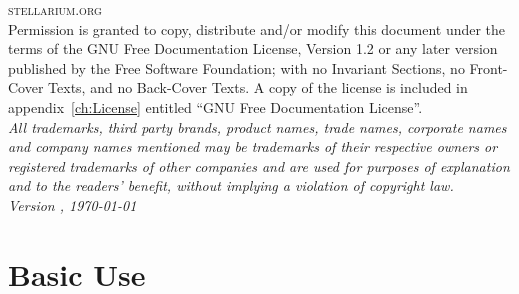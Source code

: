 \documentclass[12pt,fleqn]{book} %
\newcommand{\DocumentEdition}{1}
\begin{document}
\noindent \textsc{stellarium.org}\\ %

\noindent Permission is granted to copy, distribute and/or modify this
document under the terms of the GNU Free Documentation License,
Version 1.2 or any later version published by the Free Software
Foundation; with no Invariant Sections, no Front-Cover Texts, and no
Back-Cover Texts. A copy of the license is included in
appendix~\ref{ch:License} entitled ``GNU Free Documentation
License''.\\ %

\small{\noindent \textit{All trademarks, third party brands, product names, trade names,
corporate names and company names mentioned may be trademarks of their
respective owners or registered trademarks of other companies and are
used for purposes of explanation and to the readers' benefit, without
implying a violation of copyright law.}}\\


\noindent \textit{Version \StelVersion-\DocumentEdition, \today} %



\pagestyle{empty} %

\tableofcontents %

\cleardoublepage %

\pagestyle{fancy} %



\part{Basic Use}

\end{document}
